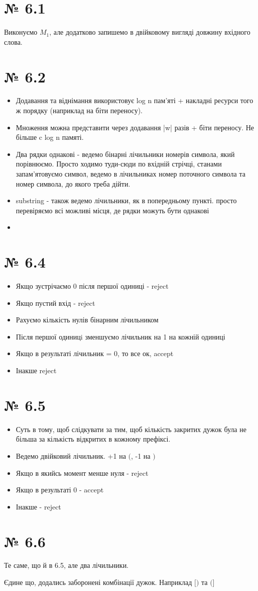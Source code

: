 \documentclass[11pt, a4paper]{article} %
\begin{document}
\section*{№ 6.1}
Виконуємо $M_1$, але додатково запишемо в двійковому вигляді довжину вхідного слова. 

\section*{№ 6.2}
\begin{itemize}
    \item Додавання та віднімання використовує log n пам'яті + накладні ресурси того ж порядку (наприклад на біти переносу).
    \item Множення можна представити через додавання |w| разів + біти переносу. Не більше c log n памяті.
    \item Два рядки однакові - ведемо бінарні лічильники номерів символа, який порівнюємо. 
    Просто ходимо туди-сюди по вхідній стрічці, станами запам'ятовуємо символ, ведемо в лічильниках номер поточного символа та номер символа, до якого треба дійти.
    \item substring - також ведемо лічильники, як в попередньому пункті. просто перевіряємо всі можливі місця, де рядки можуть бути однакові
    \item 
\end{itemize}

\section*{№ 6.4}
\begin{itemize}
    \item Якщо зустрічаємо 0 після першої одиниці - reject
    \item Якщо пустий вхід - reject
    \item Рахуємо кількість нулів бінарним лічильником
    \item Після першої одиницi зменшуємо лічильник на 1 на кожній одиниці
    \item Якщо в результаті лічильник = 0, то все ок, accept
    \item Інакше reject
\end{itemize}

\section*{№ 6.5}
\begin{itemize}
    \item Суть в тому, щоб слідкувати за тим, щоб кількість закритих дужок була не більша за кількість відкритих в кожному префіксі.
    \item Ведемо двійковий лічильник. +1 на $($, -1 на $)$
    \item Якщо в якийсь момент менше нуля - reject
    \item Якщо в результаті 0 - accept
    \item Інакше - reject
\end{itemize}

\section*{№ 6.6}
Те саме, що й в 6.5, але два лічильники.

Єдине що, додались заборонені комбінації дужок. Наприклад $[)$ та $(]$
\end{document}
